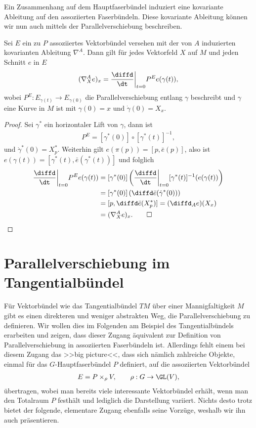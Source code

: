 \documentclass[%
	paper=a5,%
	fleqn,%
	DIV=18,%
	BCOR=0mm,
	fontsize=11pt,
	titlepage=false,%
	bibliography=totoc,
	DIV=18,%
	twoside=true,
	pdftitle=Riemannsche Geometrie,
	pdfauthor=Uwe Semmelmann,
	numbers=noendperiod]%
	{scrbook}
\begin{document}
Ein Zusammenhang auf dem Hauptfaserbündel induziert eine kovariante Ableitung
auf den assoziierten Faserbündeln. Diese kovariante Ableitung können wir nun
auch mittels der Parallelverschiebung beschreiben.

\begin{prop}
Sei $E$ ein zu $P$ assoziiertes Vektorbündel versehen mit der von $A$ induzierten kovarianten Ableitung $\nabla^A$. 
Dann gilt für jedes
Vektorfeld $X$ auf $M$ und jeden Schnitt $e$ in $E$ 
\begin{align*}
(\nabla_X^A e)_x = \frac{\diffd}{\dt}\bigg|_{t=0} P^E e(\gamma(t)),
\end{align*}
wobei $P^E: E_{\gamma(t)}\to E_{\gamma(0)}$ die Parallelverschiebung entlang
$\gamma$ beschreibt und $\gamma$ eine Kurve in $M$ ist mit $\gamma(0) = x$ und
$\dot{\gamma}(0) = X_x$.\fish
\end{prop}

\begin{proof}
Sei $\gamma^*$ ein horizontaler Lift von $\gamma$, dann ist
\begin{align*}
P^E = [\gamma^*(0)]\circ [\gamma^*(t)]^{-1},
\end{align*}
und $\dot{\gamma}^*(0) = X_p^*$. Weiterhin gilt $e(\pi(p)) = [p,\bar{e}(p)]$,
also ist $e(\gamma(t)) = [\gamma^*(t),\bar{e}(\gamma^*(t))]$ und folglich
\begin{align*}
\frac{\diffd}{\dt}\bigg|_{t=0} P^E e(\gamma(t)) &= 
[\gamma^*(0)] \left(\frac{\diffd}{\dt}\bigg|_{t=0}
[\gamma^*(t)]^{-1}(e(\gamma(t)) \right)\\
&= [\gamma^*(0)] \left(
\diffd\bar{e}(\dot{\gamma}^*(0)) \right)\\
&= [p,\diffd \bar{e}(X_p^*)]
= (\diffd_A e)(X_x) \\
&= (\nabla^A_X e)_x.\qed
\end{align*}
\end{proof}


\section{Parallelverschiebung im Tangentialbündel}

Für Vektorbündel wie das Tangentialbündel $TM$ über einer Mannigfaltigkeit $M$
gibt es einen direkteren und weniger abstrakten Weg, die Parallelverschiebung zu
definieren. Wir wollen dies im Folgenden am Beispiel des Tangentialbündels
erarbeiten und zeigen, dass dieser Zugang äquivalent zur Definition von
Parallelverschiebung in assoziierten Faserbündeln ist. Allerdings fehlt einem
bei diesem Zugang das >>big picture<<, dass sich nämlich zahlreiche 
Objekte, einmal für das $G$-Hauptfaserbündel $P$ definiert, auf die assoziierten
Vektorbündel
\begin{align*}
E = P\times_\rho V,\qquad \rho : G\to \GL(V),
\end{align*}
übertragen, wobei man bereits viele interessante Vektorbündel erhält, wenn man
den Totalraum $P$  festhält und lediglich die Darstellung
variiert.
Nichts desto trotz bietet  der folgende, elementare Zugang ebenfalls seine
Vorzüge, weshalb wir ihn auch präsentieren. 
\end{document}
